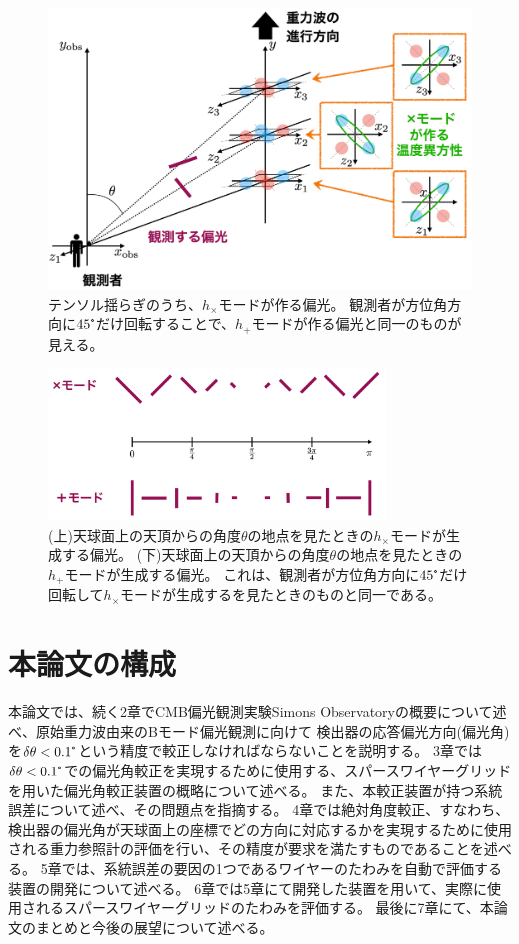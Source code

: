 \documentclass[../../main.tex]{subfiles}
\begin{document}
\begin{figure}[H]
    \centering
    \includegraphics[width=1.0\textwidth]{intro/tensor_polarization.pdf}
    \caption{テンソル揺らぎのうち、$h_{\times}$モードが作る偏光。
    観測者が方位角方向に$45\tcdegree$だけ回転することで、$h_{+}$モードが作る偏光と同一のものが見える。}
    \label{fig:tensor_polarization}
\end{figure}
\begin{figure}[H]
    \centering
    \includegraphics[width=0.8\textwidth]{intro/tensor_pol_theta.pdf}
    \caption{(上)天球面上の天頂からの角度$\theta$の地点を見たときの$h_{\times}$モードが生成する偏光。
    (下)天球面上の天頂からの角度$\theta$の地点を見たときの$h_{+}$モードが生成する偏光。
    これは、観測者が方位角方向に$45\tcdegree$だけ回転して$h_{\times}$モードが生成するを見たときのものと同一である。}
    \label{fig:tensor_polarization_theta}
\end{figure}
\section{本論文の構成}
本論文では、続く2章でCMB偏光観測実験Simons Observatoryの概要について述べ、原始重力波由来のBモード偏光観測に向けて
検出器の応答偏光方向(偏光角)を$\delta\theta < 0.1\tcdegree$という精度で較正しなければならないことを説明する。
3章では$\delta\theta<0.1\tcdegree$での偏光角較正を実現するために使用する、スパースワイヤーグリッドを用いた偏光角較正装置の概略について述べる。
また、本較正装置が持つ系統誤差について述べ、その問題点を指摘する。
4章では絶対角度較正、すなわち、検出器の偏光角が天球面上の座標でどの方向に対応するかを実現するために使用される重力参照計の評価を行い、その精度が要求を満たすものであることを述べる。
5章では、系統誤差の要因の1つであるワイヤーのたわみを自動で評価する装置の開発について述べる。
6章では5章にて開発した装置を用いて、実際に使用されるスパースワイヤーグリッドのたわみを評価する。
最後に7章にて、本論文のまとめと今後の展望について述べる。
\end{document}
